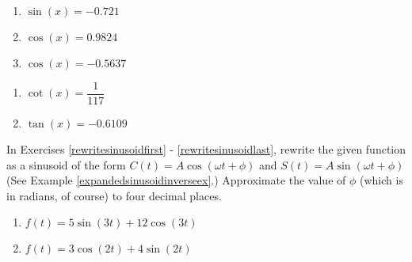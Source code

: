 \documentclass{ximera}
\begin{document}
\begin{multicols}{3}

\begin{enumerate}

\setcounter{enumi}{\value{HW}}

\item $\sin(x) = -0.721$
\item $\cos(x) = 0.9824$
\item $\cos(x) = -0.5637$

\setcounter{HW}{\value{enumi}}

\end{enumerate}

\end{multicols}

\begin{multicols}{3}

\begin{enumerate}

\setcounter{enumi}{\value{HW}}

\item $\cot(x) = \dfrac{1}{117}$
\item $\tan(x) = -0.6109$  \label{equarctriglast}

\setcounter{HW}{\value{enumi}}

\end{enumerate}

\end{multicols}


In Exercises \ref{rewritesinusoidfirst} - \ref{rewritesinusoidlast}, rewrite the given function as a sinusoid of the form $C(t) = A \cos(\omega t + \phi)$ and $S(t) = A\sin(\omega t + \phi)$ (See Example \ref{expandedsinusoidinverseex}.)  Approximate the value of $\phi$ (which is in radians, of course) to four decimal places.

\begin{multicols}{2}

\begin{enumerate}

\setcounter{enumi}{\value{HW}}

\item $f(t) = 5\sin(3t) + 12\cos(3t)$ \label{rewritesinusoidfirst}
\item $f(t) = 3\cos(2t) + 4\sin(2t)$

\setcounter{HW}{\value{enumi}}

\end{enumerate}

\end{multicols}
\end{document}
